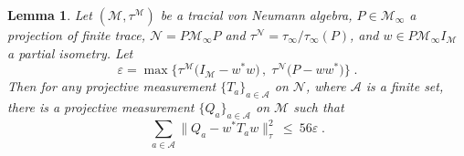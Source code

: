 \documentclass[11pt]{article}
\newtheorem{lemma}[theorem]{Lemma}
\theoremstyle{definition}
\newcommand{\Id}{\ensuremath{I}}
\newcommand{\mA}{\ensuremath{\mathcal{A}}}
\newcommand{\mM}{\ensuremath{\mathcal{M}}}
\newcommand{\eps}{\varepsilon}
\newcommand{\mN}{\mathcal{N}}
\begin{document}
\begin{lemma}\label{lem:pull-back}
Let  $(\mM,\tau^\mM)$ be a tracial von Neumann algebra, $P\in\mM_\infty$ a projection of finite trace, $\mN=P\mM_\infty P$ and $\tau^\mN=\tau_\infty/\tau_\infty(P)$, and $w\in P \mM_\infty \Id_\mM$ a partial isometry. Let 
\[ \eps = \max\big\{ \tau^\mM\big(\Id_\mM - w^* w\big)\,,\;\tau^\mN\big( P- w w^*\big)\big\}\;.\] 
 Then for any projective measurement $\{T_a\}_{a \in \mA}$ on $\mN$, where $\mA$ is a finite set, there is a projective measurement $\{Q_a\}_{a \in \mA}$ on $\mM$ such that 
\begin{equation}
\label{eq:pull-back} \sum_{a \in \mA} \big\| Q_a - w^* T_a w\big\|_{\tau}^2 \,\leq \ 56\eps\;.
\end{equation}
\end{lemma}	
\end{document}
